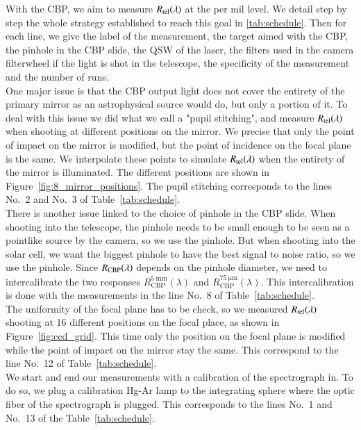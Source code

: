 With the CBP, we aim to measure $R_{\mathrm{tel}}(\lambda)$ at the per mil level. We detail step by step the whole strategy established to reach this goal in \ref{tab:schedule}. Then for each line, we give the label of the measurement, the target aimed with the CBP, the pinhole in the CBP slide, the QSW of the laser, the filters used in the \SD camera filterwheel if the light is shot in the telescope, the specificity of the measurement and the number of runs. \\

One major issue is that the CBP output light does not cover the entirety of the \SD primary mirror as an astrophysical source would do, but only a portion of it. To deal with this issue we did what we call a "pupil stitching", and measure $R_{\mathrm{tel}}(\lambda)$ when shooting at different positions on the mirror. We precise that only the point of impact on the mirror is modified, but the point of incidence on the focal plane is the same. We interpolate these points to simulate $R_{\mathrm{tel}}(\lambda)$ when the entirety of the mirror is illuminated. The different positions are shown in Figure~\ref{fig:8_mirror_positions}. The pupil stitching corresponds to the lines No.~2 and No.~3 of Table~\ref{tab:schedule}. \\

There is another issue linked to the choice of pinhole in the CBP slide. When shooting into the \SD telescope, the pinhole needs to be small enough to be seen as a pointlike source by the \SD camera, so we use the \spinhole pinhole. But when shooting into the solar cell, we want the biggest pinhole to have the best signal to noise ratio, so we use the \bpinhole pinhole. Since $R_{\mathrm{CBP}}(\lambda)$ depends on the pinhole diameter, we need to intercalibrate the two responses $R_\mathrm{CBP}^{\mathrm{\SI{5}{\milli\meter}}} (\lambda)$ and $R_\mathrm{CBP}^{\mathrm{\SI{75}{\micro\meter}}} (\lambda)$. This intercalibration is done with the measurements in the line No.~8 of Table~\ref{tab:schedule}. \\

The uniformity of the \SD focal plane has to be check, so we measured $R_{\mathrm{tel}}(\lambda)$ shooting at 16 different positions on the focal place, as shown in Figure~\ref{fig:ccd_grid}. This time only the position on the focal plane is modified while the point of impact on the mirror stay the same. This correspond to the line No.~12 of Table~\ref{tab:schedule}. \\

We start and end our measurements with a calibration of the spectrograph in. To do so, we plug a calibration Hg-Ar  lamp to the integrating sphere where the optic fiber of the spectrograph is plugged. This corresponds to the lines No.~1 and No.~13 of the Table~\ref{tab:schedule}.\\

